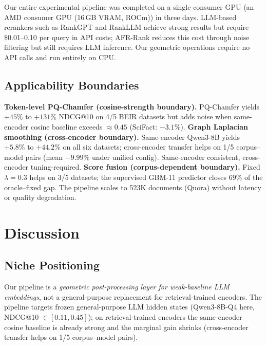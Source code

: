 \documentclass[review,1p]{elsarticle}
\begin{document}
Our entire experimental pipeline was completed on a single consumer GPU (an AMD consumer GPU (16\,GB VRAM, ROCm)) in three days. LLM-based rerankers such as RankGPT \citep{sun2024rankgpt} and RankLLM \citep{pradeep2025rankllm} achieve strong results but require \$0.01--0.10 per query in API costs; AFR-Rank \citep{afrrank2025} reduces this cost through noise filtering but still requires LLM inference. Our geometric operations require no API calls and run entirely on CPU.

\subsection{Applicability Boundaries}
\label{subsec:boundaries}

\textbf{Token-level PQ-Chamfer (cosine-strength boundary).} PQ-Chamfer yields $+45\%$ to $+131\%$ NDCG@10 on 4/5 BEIR datasets but adds noise when same-encoder cosine baseline exceeds $\approx 0.45$ (SciFact: $-3.1\%$). \textbf{Graph Laplacian smoothing (cross-encoder boundary).} Same-encoder Qwen3-8B yields $+5.8\%$ to $+44.2\%$ on all six datasets; cross-encoder transfer helps on 1/5 corpus--model pairs (mean $-9.99\%$ under unified config). Same-encoder consistent, cross-encoder tuning-required. \textbf{Score fusion (corpus-dependent boundary).} Fixed $\lambda=0.3$ helps on 3/5 datasets; the supervised GBM-11 predictor closes $69\%$ of the oracle--fixed gap. The pipeline scales to 523K documents (Quora) without latency or quality degradation.

\section{Discussion}
\label{sec:discussion}

\subsection{Niche Positioning}
\label{subsec:niche}

Our pipeline is a \emph{geometric post-processing layer for weak-baseline LLM embeddings}, not a general-purpose replacement for retrieval-trained encoders. The pipeline targets frozen general-purpose LLM hidden states (Qwen3-8B-Q4 here, NDCG@10 $\in [0.11, 0.45]$); on retrieval-trained encoders the same-encoder cosine baseline is already strong and the marginal gain shrinks (cross-encoder transfer helps on 1/5 corpus--model pairs).
\end{document}
